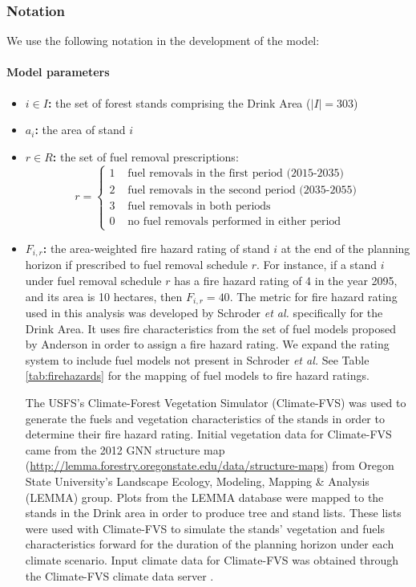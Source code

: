 \subsubsection{Notation}
We use the following notation in the development of the model:

\paragraph{Model parameters}
\begin{itemize}
\item \textbf{$i \in I$:} the set of forest stands comprising the Drink Area ($|I| = 303$)

\item \textbf{$a_i$:} the area of stand $i$

\item \textbf{$r \in R$:} the set of fuel removal prescriptions:
	$$
	r =
	\begin{cases}
	1 &\text{ fuel removals in the first period (2015-2035)}\\
	2 &\text{ fuel removals in the second period (2035-2055)}\\
	3 &\text{ fuel removals in both periods}\\
	0 &\text{ no fuel removals performed in either period}
	\end{cases}
	$$
	
\item \textbf{$F_{i,r}$:} the area-weighted fire hazard rating of stand $i$ at the end of the planning horizon if prescribed to fuel removal schedule $r$. For instance, if a stand $i$ under fuel removal schedule $r$ has a fire hazard rating of 4 in the year 2095, and its area is 10 hectares, then $F_{i,r} = 40$. The metric for fire hazard rating used in this analysis was developed by Schroder \textit{et al.} \cite{schroder2016multi} specifically for the Drink Area. It uses fire characteristics from the set of fuel models proposed by Anderson \cite{anderson1982aids} in order to assign a fire hazard rating. We expand the rating system to include fuel models not present in Schroder \textit{et al.} See Table \ref{tab:firehazards} for the mapping of fuel models to fire hazard ratings.

The USFS's Climate-Forest Vegetation Simulator (Climate-FVS) was used to generate the fuels and vegetation characteristics of the stands in order to determine their fire hazard rating. Initial vegetation data for Climate-FVS came from the 2012 GNN structure map (\url{http://lemma.forestry.oregonstate.edu/data/structure-maps}) from Oregon State University's Landscape Ecology, Modeling, Mapping \& Analysis (LEMMA) group. Plots from the LEMMA database were mapped to the stands in the Drink area in order to produce tree and stand lists. These lists were used with Climate-FVS to simulate the stands' vegetation and fuels characteristics forward for the duration of the planning horizon under each climate scenario. Input climate data for Climate-FVS was obtained through the Climate-FVS climate data server \cite{climateFVSReadyData}.


\end{itemize}
